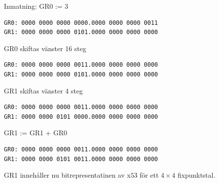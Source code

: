 \documentclass[]{article}
\begin{document}
\begin{appendices}
\newpage

Inmatning: GR0 := 3
\begin{framed}
\begin{verbatim}
GR0: 0000 0000 0000 0000.0000 0000 0000 0011
GR1: 0000 0000 0000 0101.0000 0000 0000 0000
\end{verbatim}
\end{framed}

GR0 skiftas vänster 16 steg
\begin{framed}
\begin{verbatim}
GR0: 0000 0000 0000 0011.0000 0000 0000 0000
GR1: 0000 0000 0000 0101.0000 0000 0000 0000
\end{verbatim}
\end{framed}

GR1 skiftas vänster 4 steg
\begin{framed}
\begin{verbatim}
GR0: 0000 0000 0000 0011.0000 0000 0000 0000
GR1: 0000 0000 0101 0000.0000 0000 0000 0000
\end{verbatim}
\end{framed}

GR1 := GR1 + GR0
\begin{framed}
\begin{verbatim}
GR0: 0000 0000 0000 0011.0000 0000 0000 0000
GR1: 0000 0000 0101 0011.0000 0000 0000 0000
\end{verbatim}
\end{framed}

GR1 innehåller nu bitrepresentatinen av x$53$ för ett $4 \times 4$ fixpunktstal.
\end{appendices}
\end{document}

